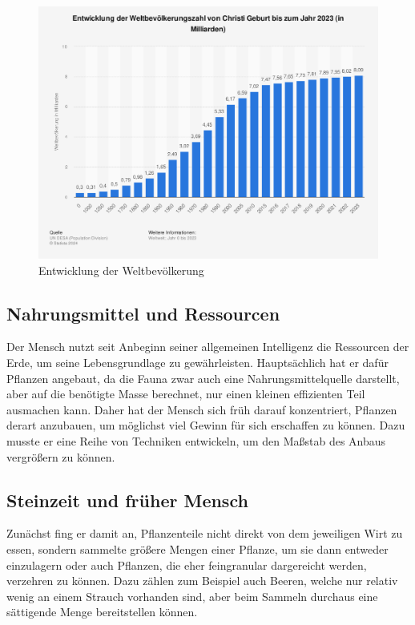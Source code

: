 \begin{figure}
    \centering
    \includegraphics[width=1\linewidth]{1694.png}
    \caption{Entwicklung der Weltbevölkerung}
    \label{fig:enter-label}
\end{figure}
\subsection{Nahrungsmittel und Ressourcen}
Der Mensch nutzt seit Anbeginn seiner allgemeinen Intelligenz die Ressourcen der Erde, um seine Lebensgrundlage zu gewährleisten. Hauptsächlich hat er dafür Pflanzen angebaut, da die Fauna zwar auch eine Nahrungsmittelquelle darstellt, aber auf die benötigte Masse berechnet, nur einen kleinen effizienten Teil ausmachen kann. Daher hat der Mensch sich früh darauf konzentriert, Pflanzen derart anzubauen, um möglichst viel Gewinn für sich erschaffen zu können. Dazu musste er eine Reihe von Techniken entwickeln, um den Maßstab des Anbaus vergrößern zu können. 
\subsection{Steinzeit und früher Mensch}
Zunächst fing er damit an, Pflanzenteile nicht direkt von dem jeweiligen Wirt zu essen, sondern sammelte größere Mengen einer Pflanze, um sie dann entweder einzulagern oder auch Pflanzen, die eher feingranular dargereicht werden, verzehren zu können. Dazu zählen zum Beispiel auch Beeren, welche nur relativ wenig an einem Strauch vorhanden sind, aber beim Sammeln durchaus eine sättigende Menge bereitstellen können. \cite{early}
